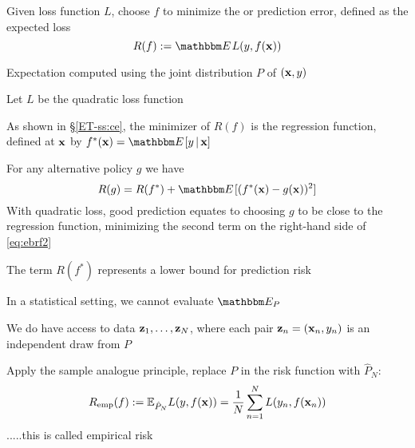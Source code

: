 \begin{frame}

    \vspace{2em}
    Given loss function $L$, choose $f$ to minimize the
     or prediction error, defined as the expected loss
    \begin{equation*}
        \label{eq:rf}
        R(f) := \EE L(y, f(\boldx)) 
    \end{equation*}
    
    
    Expectation computed using the joint distribution $P$ of $({\mathbf x}, y)$
    
    
\end{frame}

\begin{frame}

    \vspace{2em}
    \Eg
        Let $L$ be the quadratic loss function
        
        As shown in \S\ref{ET-ss:ce},
        the minimizer of $R(f)$ is the regression function, defined 
        at ${\mathbf x}$ by $f^*(\boldx) = \EE[y \given \boldx]$
        
        For any alternative policy $g$
        we have
        \begin{equation}
            \label{eq:ebrf2}
            R(g) =  R(f^*) + \EE[ (f^*(\boldx) - g(\boldx))^2 ] 
        \end{equation}
        With quadratic loss, good prediction equates to choosing
        $g$ to be close to the regression function,  minimizing the second
        term on the right-hand side of \eqref{eq:ebrf2}
        
        The term $R(f^*)$ represents a lower bound for
        prediction risk
        
\end{frame}

\begin{frame}

    \vspace{2em}
    In a statistical setting, we cannot evaluate $\EEP$
    
    We do have access to data
    ${\mathbf z}_1, \ldots, {\mathbf z}_N$, where each pair ${\mathbf z}_n = ({\mathbf x}_n, y_n)$ is
    an independent draw from $P$
    
    \vspace{.7em}
    Apply the
    sample analogue principle, replace $P$ in the risk function with $\hat P_N$:
    \begin{equation*}
        \label{eq:erf}
        R_{{\rm emp}}(f) 
        := \mathbb{E}_{\hat P_N} L(y, f({\mathbf x}))
        = \frac{1}{N} \sum_{n=1}^N L(y_n, f({\mathbf x}_n))
    \end{equation*}
    .....this is called empirical risk
    
\end{frame}


